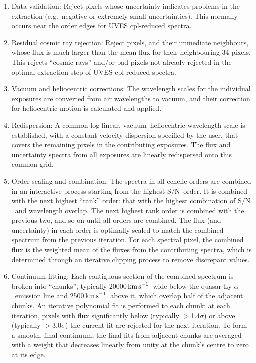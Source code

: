 \documentclass[fleqn,usenatbib,usedcolumn]{mnras}
\newcommand{\kms}{\ensuremath{\textrm{km\,s}^{-1}}}
\newcommand{\SN}{\ensuremath{\textrm{S/N}}}
\newcommand{\lya}{\ensuremath{\textrm{Ly-}\alpha}}
\begin{document}
\begin{enumerate}
\item Data validation: Reject pixels whose uncertainty indicates problems in the extraction (e.g.\ negative or extremely small uncertainties). This normally occurs near the order edges for UVES {\sc cpl}-reduced spectra.
\item Residual cosmic ray rejection: Reject pixels, and their immediate neighbours, whose flux is much larger than the mean flux for their neighbouring 34 pixels. This rejects ``cosmic rays'' and/or bad pixels not already rejected in the optimal extraction step of UVES {\sc cpl}-reduced spectra.
\item Vacuum and heliocentric corrections: The wavelength scales for the individual exposures are converted from air wavelengths to vacuum, and their correction for heliocentric motion is calculated and applied.
\item Redispersion: A common log-linear, vacuum--heliocentric wavelength scale is established, with a constant velocity dispersion specified by the user, that covers the remaining pixels in the contributing exposures. The flux and uncertainty spectra from all exposures are linearly redispersed onto this common grid.
\item Order scaling and combination: The spectra in all echelle orders are combined in an interactive process starting from the highest \SN\ order. It is combined with the next highest ``rank'' order: that with the highest combination of \SN\ and wavelength overlap. The next highest rank order is combined with the previous two, and so on until all orders are combined. The flux (and uncertainty) in each order is optimally scaled to match the combined spectrum from the previous iteration. For each spectral pixel, the combined flux is the weighted mean of the fluxes from the contributing spectra, which is determined through an iterative clipping process to remove discrepant values.
\item Continuum fitting: Each contiguous section of the combined spectrum is broken into ``chunks'', typically 20000\,\kms\ wide below the quasar \lya\ emission line and 2500\,\kms\ above it, which overlap half of the adjacent chunks. An iterative polynomial fit is performed to each chunk: at each iteration, pixels with flux significantly below (typically $>$1.4$\sigma$) or above (typically $>$3.0$\sigma$) the current fit are rejected for the next iteration. To form a smooth, final continuum, the final fits from adjacent chunks are averaged with a weight that decreases linearly from unity at the chunk's centre to zero at its edge.
\end{enumerate}
\end{document}
